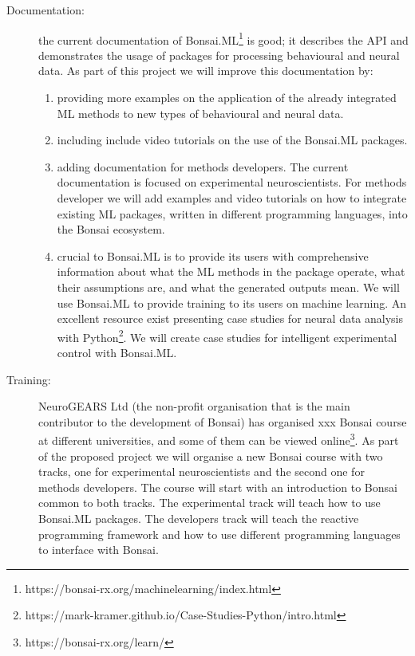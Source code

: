 \begin{description}

    \item[Documentation:] the current documentation of
        Bonsai.ML\footnote[5]{https://bonsai-rx.org/machinelearning/index.html}
        is good; it describes the API and demonstrates the usage of packages
        for processing behavioural and neural data. As part of this project we
        will improve this documentation by:

    \begin{enumerate}

        \item providing more examples on the application of the already
            integrated ML methods to new types of behavioural and neural data.

        \item including include video tutorials on the use of the Bonsai.ML
            packages.

        \item adding documentation for methods developers. The current
            documentation is focused on experimental neuroscientists. For
            methods developer we will add examples and video tutorials on how
            to integrate existing ML packages, written in different programming
            languages, into the Bonsai ecosystem.

        \item crucial to Bonsai.ML is to provide its users with comprehensive
            information about what the ML methods in the package operate, what
            their assumptions are, and what the generated outputs mean. We will
            use Bonsai.ML to provide training to its users on machine learning.
            An excellent resource exist presenting case studies for neural data
            analysis with
            Python\footnote[6]{https://mark-kramer.github.io/Case-Studies-Python/intro.html}.
            We will create case studies for intelligent experimental control
            with Bonsai.ML.

    \end{enumerate}

    \item[Training:] NeuroGEARS Ltd (the non-profit organisation that is the
        main contributor to the development of Bonsai) has organised xxx Bonsai
        course at different universities, and some of them can be viewed
        online\footnote[7]{https://bonsai-rx.org/learn/}. As part of the
        proposed project we will organise a new Bonsai course with two tracks,
        one for experimental neuroscientists and the second one for methods
        developers. The course will start with an introduction to Bonsai common
        to both tracks. The experimental track will teach how to use Bonsai.ML
        packages. The developers track will teach the reactive programming
        framework and how to use different programming languages to interface
        with Bonsai.


\end{description}
